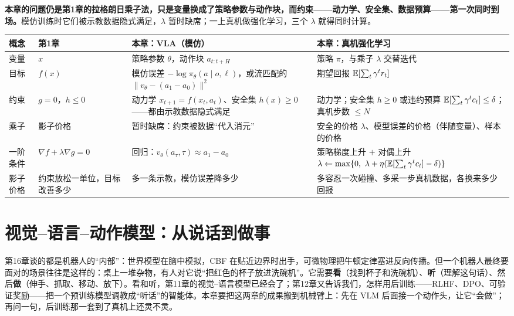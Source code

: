 \begin{tcolorbox}[colback=yellow!10, colframe=orange!80, title=本章的核心观点]
\textbf{本章的问题仍是第1章的拉格朗日乘子法，只是变量换成了策略参数与动作块，而约束——动力学、安全集、数据预算——第一次同时到场。}模仿训练时它们被示教数据隐式满足，$\lambda$ 暂时缺席；一上真机做强化学习，三个 $\lambda$ 就得同时计算。

\begin{center}
\renewcommand{\arraystretch}{1.3}
\setlength{\tabcolsep}{3pt}
\footnotesize
\begin{tabular}{p{1.0cm}p{1.8cm}p{3.9cm}p{4.2cm}}
\toprule
\textbf{概念} & \textbf{第1章} & \textbf{本章：VLA（模仿）} & \textbf{本章：真机强化学习} \\
\midrule
变量 & $x$ & 策略参数 $\theta$，动作块 $a_{t:t+H}$ & 策略 $\pi$，与乘子 $\lambda$ 交替迭代 \\
目标 & $f(x)$ & 模仿误差 $-\log \pi_\theta(a \mid o, \ell)$，或流匹配的 $\|v_\theta - (a_1 - a_0)\|^2$ & 期望回报 $\mathbb{E}[\sum_t \gamma^t r_t]$ \\
约束 & $g = 0$，$h \le 0$ & 动力学 $x_{t+1} = f(x_t, a_t)$、安全集 $h(x) \ge 0$——都由示教数据隐式满足 & 动力学；安全集 $h \ge 0$ 或违约预算 $\mathbb{E}[\sum_t \gamma^t c_t] \le \delta$；真机步数 $\le N$ \\
乘子 & 影子价格 & 暂时缺席：约束被数据“代入消元” & 安全的价格 $\lambda$、模型误差的价格（伴随变量）、样本的价格 \\
一阶条件 & $\nabla f + \lambda \nabla g = 0$ & 回归：$v_\theta(a_\tau, \tau) \approx a_1 - a_0$ & 策略梯度上升 $+$ 对偶上升 $\lambda \leftarrow \max\{0,\ \lambda + \eta(\mathbb{E}[\sum_t \gamma^t c_t] - \delta)\}$ \\
影子价格 & 约束放松一单位，目标改善多少 & 多一条示教，模仿误差降多少 & 多容忍一次碰撞、多采一步真机数据，各换来多少回报 \\
\bottomrule
\end{tabular}
\end{center}
\end{tcolorbox}

\section{视觉--语言--动作模型：从说话到做事}

第16章谈的都是机器人的“内部”：世界模型在脑中模拟，CBF 在贴近边界时出手，可微物理把牛顿定律塞进反向传播。但一个机器人最终要面对的场景往往是这样的：桌上一堆杂物，有人对它说“把红色的杯子放进洗碗机”。它需要\textbf{看}（找到杯子和洗碗机）、\textbf{听}（理解这句话）、然后\textbf{做}（伸手、抓取、移动、放下）。看和听，第11章的视觉--语言模型已经会了；第12章又告诉我们，怎样用后训练——RLHF、DPO、可验证奖励——把一个预训练模型调教成“听话”的智能体。本章要把这两章的成果搬到机械臂上：先在 VLM 后面接一个动作头，让它“会做”；再问一句，后训练那一套到了真机上还灵不灵。

